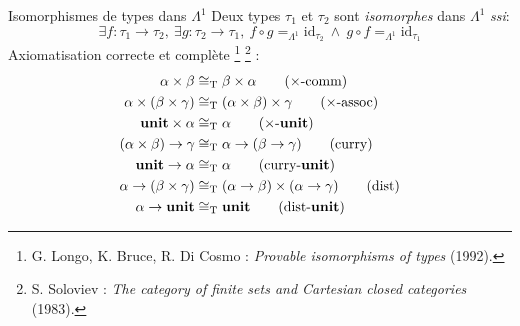 \documentclass[serif]{beamer}
\newcommand{\ssi}{\textit{ssi}\xspace}
\newcommand{\unit}{\bold{unit}}
\newcommand{\T}{\mathrm{T}}
\begin{document}
\begin{frame}{Isomorphismes de types dans $\Lambda^1$}
\small
Deux types $\tau_1$ et $\tau_2$ sont \emph{isomorphes} dans $\Lambda^1$ \ssi :
\[ \exists f : \tau_1 \rightarrow \tau_2,\ \exists g : \tau_2 \rightarrow \tau_1,\ f \circ g =_{\Lambda^1} \mathrm{id}_{\tau_2} \ \wedge\ g \circ f =_{\Lambda^1} \mathrm{id}_{\tau_1} \]
Axiomatisation correcte et complète \footnote{G. Longo, K. Bruce, R. Di Cosmo : \textit{Provable isomorphisms of types} (1992).} \footnote{S. Soloviev : \textit{The category of finite sets and Cartesian closed categories} (1983).} :
\begin{align}
    \alpha \times \beta &\cong_\T
    \beta \times \alpha
    \label{prod_comm}
    \tag{$\times$-comm}
  \\
    \alpha \times (\beta \times \gamma) &\cong_\T
    (\alpha \times \beta) \times \gamma
    \label{prod_assoc}
    \tag{$\times$-assoc}
  \\
    \unit \times \alpha &\cong_\T
    \alpha
    \label{prod_unit}
    \tag{$\times$-$\unit$}
  \\
    (\alpha \times \beta) \rightarrow \gamma &\cong_\T
    \alpha \rightarrow (\beta \rightarrow \gamma)
    \label{curry}
    \tag{curry}
  \\
    \unit \rightarrow \alpha &\cong_\T
    \alpha
    \label{curry_unit}
    \tag{curry-$\unit$}
  \\
    \alpha \rightarrow (\beta \times \gamma) &\cong_\T
    (\alpha \rightarrow \beta) \times (\alpha \rightarrow \gamma)
    \label{dist}
    \tag{dist}
  \\
    \alpha \rightarrow \unit &\cong_\T
    \unit
    \label{dist_unit}
    \tag{dist-$\unit$}
\end{align}
\end{frame}

\end{document}

